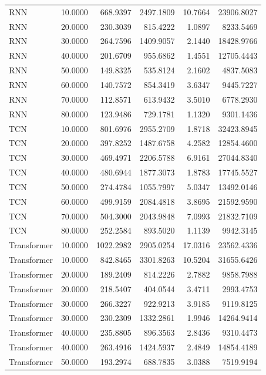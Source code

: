\begin{tabular}{lrrrrr}
RNN & 10.0000 & 668.9397 & 2497.1809 & 10.7664 & 23906.8027 \\
RNN & 20.0000 & 230.3039 & 815.4222 & 1.0897 & 8233.5469 \\
RNN & 30.0000 & 264.7596 & 1409.9057 & 2.1440 & 18428.9766 \\
RNN & 40.0000 & 201.6709 & 955.6862 & 1.4551 & 12705.4443 \\
RNN & 50.0000 & 149.8325 & 535.8124 & 2.1602 & 4837.5083 \\
RNN & 60.0000 & 140.7572 & 854.3419 & 3.6347 & 9445.7227 \\
RNN & 70.0000 & 112.8571 & 613.9432 & 3.5010 & 6778.2930 \\
RNN & 80.0000 & 123.9486 & 729.1781 & 1.1320 & 9301.1436 \\
TCN & 10.0000 & 801.6976 & 2955.2709 & 1.8718 & 32423.8945 \\
TCN & 20.0000 & 397.8252 & 1487.6758 & 4.2582 & 12854.4600 \\
TCN & 30.0000 & 469.4971 & 2206.5788 & 6.9161 & 27044.8340 \\
TCN & 40.0000 & 480.6944 & 1877.3073 & 1.8783 & 17745.5527 \\
TCN & 50.0000 & 274.4784 & 1055.7997 & 5.0347 & 13492.0146 \\
TCN & 60.0000 & 499.9159 & 2084.4818 & 3.8695 & 21592.9590 \\
TCN & 70.0000 & 504.3000 & 2043.9848 & 7.0993 & 21832.7109 \\
TCN & 80.0000 & 252.2584 & 893.5020 & 1.1139 & 9942.3145 \\
Transformer & 10.0000 & 1022.2982 & 2905.0254 & 17.0316 & 23562.4336 \\
Transformer & 10.0000 & 842.8465 & 3301.8263 & 10.5204 & 31655.6426 \\
Transformer & 20.0000 & 189.2409 & 814.2226 & 2.7882 & 9858.7988 \\
Transformer & 20.0000 & 218.5407 & 404.0544 & 3.4711 & 2993.4753 \\
Transformer & 30.0000 & 266.3227 & 922.9213 & 3.9185 & 9119.8125 \\
Transformer & 30.0000 & 230.2309 & 1332.2861 & 1.9946 & 14264.9414 \\
Transformer & 40.0000 & 235.8805 & 896.3563 & 2.8436 & 9310.4473 \\
Transformer & 40.0000 & 263.4916 & 1424.5937 & 2.4849 & 14854.4189 \\
Transformer & 50.0000 & 193.2974 & 688.7835 & 3.0388 & 7519.9194 \\

\end{tabular}
